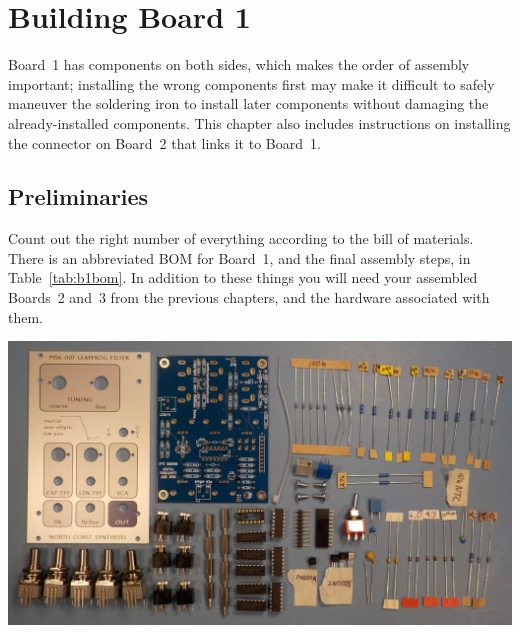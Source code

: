 
%
%
%
%
%
%

\chapter{Building Board 1}

Board~1 has components on both sides, which makes the order of assembly
important; installing the wrong components first may make it difficult to
safely maneuver the soldering iron to install later components without
damaging the already-installed components.  This chapter also includes
instructions on installing the connector on Board~2 that links it to
Board~1.

\section{Preliminaries}

Count out the right number of everything according to the bill of materials. 
There is an abbreviated BOM for Board~1, and the final assembly steps, in
Table~\ref{tab:b1bom}.  In addition to these things you will need your
assembled Boards~2 and~3 from the previous chapters, and the hardware
associated with them.

\noindent\includegraphics[width=\linewidth]{board1-parts.jpg}

